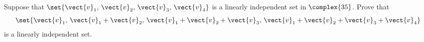 Suppose that $\set{\vect{v}_1,\,\vect{v}_2,\,\vect{v}_3,\,\vect{v}_4}$ is a linearly independent set in $\complex{35}$.  Prove that 
%
\begin{equation*}
\set{
\vect{v}_1,\,
\vect{v}_1+\vect{v}_2,\,
\vect{v}_1+\vect{v}_2+\vect{v}_3,\,
\vect{v}_1+\vect{v}_2+\vect{v}_3+\vect{v}_4
}
\end{equation*}
%
is a linearly independent set.